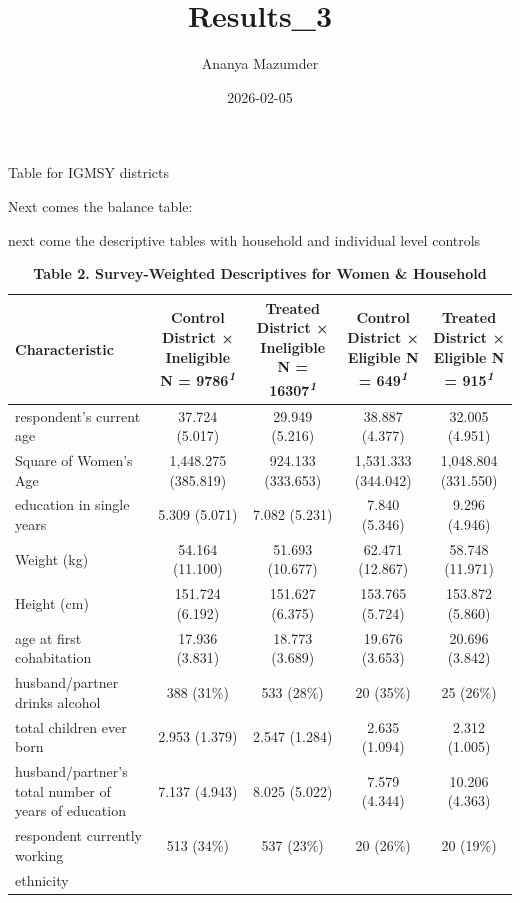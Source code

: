 \documentclass[
]{article}
\title{Results\_3}
\author{Ananya Mazumder}
\date{2026-02-05}
\begin{document}
\maketitle

Table for IGMSY districts

Next comes the balance table:

next come the descriptive tables with household and individual level
controls

\begin{table}[t]
\caption{\label{tab:First descriptive table}\textbf{Table 2. Survey-Weighted Descriptives for Women \& Household}} 
\fontsize{12.0pt}{14.0pt}\selectfont
\begin{tabular*}{\linewidth}{@{\extracolsep{\fill}}lcccc}
\toprule
\textbf{Characteristic} & \textbf{Control District × Ineligible}  N = 9786\textsuperscript{\textit{1}} & \textbf{Treated District × Ineligible}  N = 16307\textsuperscript{\textit{1}} & \textbf{Control District × Eligible}  N = 649\textsuperscript{\textit{1}} & \textbf{Treated District × Eligible}  N = 915\textsuperscript{\textit{1}} \\ 
\midrule\addlinespace[2.5pt]
respondent's current age & 37.724
(5.017) & 29.949
(5.216) & 38.887
(4.377) & 32.005
(4.951) \\ 
Square of Women's Age & 1,448.275
(385.819) & 924.133
(333.653) & 1,531.333
(344.042) & 1,048.804
(331.550) \\ 
education in single years & 5.309
(5.071) & 7.082
(5.231) & 7.840
(5.346) & 9.296
(4.946) \\ 
Weight (kg) & 54.164
(11.100) & 51.693
(10.677) & 62.471
(12.867) & 58.748
(11.971) \\ 
Height (cm) & 151.724
(6.192) & 151.627
(6.375) & 153.765
(5.724) & 153.872
(5.860) \\ 
age at first cohabitation & 17.936
(3.831) & 18.773
(3.689) & 19.676
(3.653) & 20.696
(3.842) \\ 
husband/partner drinks alcohol & 388 (31\%) & 533 (28\%) & 20 (35\%) & 25 (26\%) \\ 
total children ever born & 2.953
(1.379) & 2.547
(1.284) & 2.635
(1.094) & 2.312
(1.005) \\ 
husband/partner's total number of years of education & 7.137
(4.943) & 8.025
(5.022) & 7.579
(4.344) & 10.206
(4.363) \\ 
respondent currently working & 513 (34\%) & 537 (23\%) & 20 (26\%) & 20 (19\%) \\ 
ethnicity &  &  &  &  \\ 

\end{tabular*}
\end{table}
\end{document}
